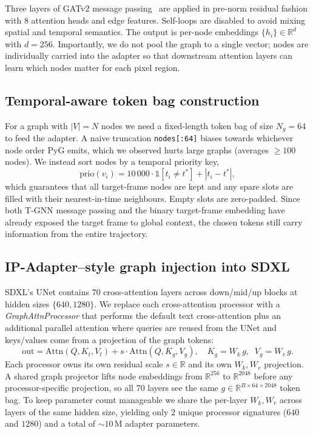 \documentclass[11pt]{article}
\begin{document}
Three layers of GATv2 message passing~\cite{brody2022gatv2} are applied
in pre-norm residual fashion with $8$ attention heads and edge
features. Self-loops are disabled to avoid mixing spatial and temporal
semantics. The output is per-node embeddings $\{h_i\}\in\mathbb{R}^d$
with $d=256$. Importantly, we do not pool the graph to a single vector;
nodes are individually carried into the adapter so that downstream
attention layers can learn which nodes matter for each pixel region.

\subsection{Temporal-aware token bag construction}
For a graph with $|V|=N$ nodes we need a fixed-length token bag of size
$N_g=64$ to feed the adapter. A naive truncation
\texttt{nodes[:64]} biases towards whichever node order PyG emits,
which we observed hurts large graphs (averages $\geq 100$ nodes). We
instead sort nodes by a temporal priority key,
\[
\text{prio}(v_i) = 10\,000\cdot \mathbb{1}[t_i\neq t^*] + |t_i-t^*|,
\]
which guarantees that all target-frame nodes are kept and any spare
slots are filled with their nearest-in-time neighbours. Empty slots are
zero-padded. Since both T-GNN message passing and the binary
target-frame embedding have already exposed the target frame to global
context, the chosen tokens still carry information from the entire
trajectory.

\subsection{IP-Adapter--style graph injection into SDXL}
\label{ssec:adapter}
SDXL's UNet contains $70$ cross-attention layers across down/mid/up
blocks at hidden sizes $\{640,1280\}$. We replace each cross-attention
processor with a \emph{Graph\-Attn\-Processor} that performs the
default text cross-attention plus an additional parallel attention
where queries are reused from the UNet and keys/values come from a
projection of the graph tokens:
\[
\mathrm{out} = \mathrm{Attn}(Q,K_t,V_t) + s\cdot
\mathrm{Attn}(Q,K_g,V_g),
\quad K_g=W_k\,g, \;\; V_g=W_v\,g.
\]
Each processor owns its own residual scale $s\in\mathbb{R}$ and its own
$W_k,W_v$ projection. A shared graph projector lifts node embeddings
from $\mathbb{R}^{256}$ to $\mathbb{R}^{2048}$ before any
processor-specific projection, so all $70$ layers see the same
$g\in\mathbb{R}^{B\times 64\times 2048}$ token bag. To keep parameter
count manageable we share the per-layer $W_k,W_v$ across layers of the
same hidden size, yielding only $2$ unique processor signatures
($640$ and $1280$) and a total of $\sim 10\,\text{M}$ adapter
parameters.
\end{document}
